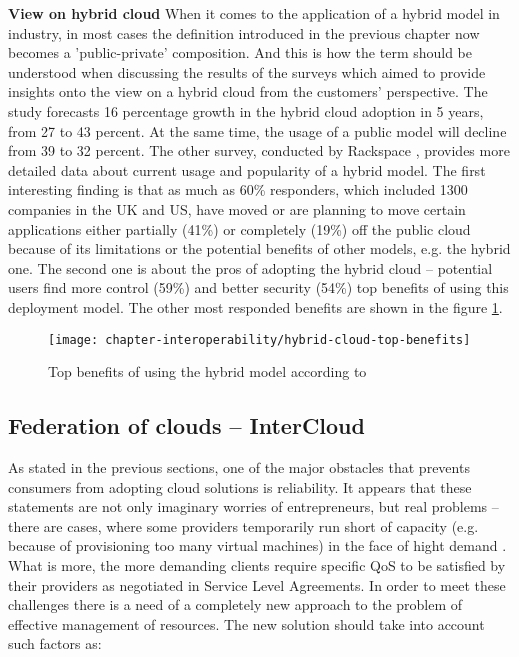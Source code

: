 \begin{asparaenum}
 \item[\textbf{View on hybrid cloud}] When it comes to the application of a hybrid model in industry, in most cases the definition introduced in the previous chapter now becomes a 'public-private' composition. And this is how the term should be understood when discussing the results of the surveys which aimed to provide insights onto the view on a hybrid cloud from the customers' perspective.
The study \cite{NBSurvey13} forecasts 16 percentage growth in the hybrid cloud adoption in 5 years, from 27 to 43 percent. At the same time, the usage of a public model will decline from 39 to 32 percent.
The other survey, conducted by Rackspace \cite{RackspaceSurvey13}, provides more detailed data about current usage and popularity of a hybrid model. The first interesting finding is that as much as 60\% responders, which included 1300 companies in the UK and US, have moved or are planning to move certain applications either partially (41\%) or completely (19\%) off the public cloud because of its limitations or the potential benefits of other models, e.g. the hybrid one. The second one is about the pros of adopting the hybrid cloud  -- potential users find more control (59\%) and better security (54\%) top benefits of using this deployment model. The other most responded benefits are shown in the figure \ref{fig:hybrid-cloud-top-benefits}.

\begin{figure}[!ht]
  \begin{center}
    \texttt{[image: chapter-interoperability/hybrid-cloud-top-benefits]}
  \end{center}
  \caption{Top benefits of using the hybrid model according to \cite{RackspaceSurvey13}}
  \label{fig:hybrid-cloud-top-benefits}
\end{figure}

\end{asparaenum}

\subsection{Federation of clouds -- InterCloud}
As stated in the previous sections, one of the major obstacles that prevents consumers from adopting cloud solutions is reliability. It appears that these statements are not only imaginary worries of entrepreneurs, but real problems -- there are cases, where some providers temporarily run short of capacity (e.g. because of provisioning too many virtual machines) in the face of hight demand \cite{Lavitt09}. What is more, the more demanding clients require specific QoS to be satisfied by their providers as negotiated in Service Level Agreements.
In order to meet these challenges there is a need of a completely new approach to the problem of effective management of resources. The new solution should take into account such factors as:

